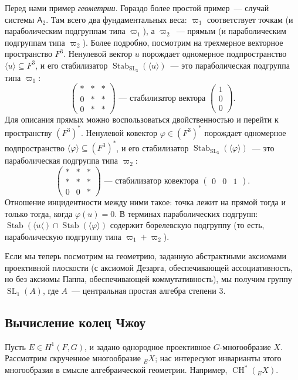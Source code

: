 \documentclass[a4paper]{article}
\DeclareMathOperator{\SL}{SL}
\DeclareMathOperator{\Stab}{Stab}
\DeclareMathOperator{\CH}{CH}
\newcommand{\ph}{\varphi}
\theoremstyle{definition}
\newcommand{\la}{\langle}
\newcommand{\ra}{\rangle}
\begin{document}
Перед нами пример \emph{геометрии}.
Гораздо более простой пример~--- случай системы $\mathsf{A}_2$.
Там всего два фундаментальных веса:
$\varpi_1$ соответствует точкам (и параболическим подгруппам типа $\varpi_1$),
а $\varpi_2$~--- прямым (и параболическим подгруппам типа $\varpi_2$).
Более подробно, посмотрим на трехмерное векторное пространство $F^3$.
Ненулевой вектор $u$ порождает одномерное подпространство
$\la u\ra\subseteq F^3$, и его стабилизатор
$\Stab_{\SL_3}(\la u\ra)$~--- это параболическая подгруппа типа $\varpi_1$:
\[
\begin{pmatrix}
* & * & * \\ 0 & * & * \\ 0 & * & *
\end{pmatrix}
\mbox{ --- стабилизатор вектора }
\begin{pmatrix} 1 \\ 0 \\ 0 \end{pmatrix}.
\]
Для описания прямых можно воспользоваться двойственностью и перейти
к пространству $(F^3)^*$.
Ненулевой ковектор $\ph\in(F^3)^*$ порождает одномерное подпространство
$\la\ph\ra\subseteq (F^3)^*$, и его стабилизатор
$\Stab_{\SL_3}(\la \ph \ra)$~--- это параболическая подгруппа типа
$\varpi_2$:
\[
\begin{pmatrix}
* & * & * \\ * & * & * \\ 0 & 0 & *
\end{pmatrix}
\mbox{ --- стабилизатор ковектора }
\begin{pmatrix} 0 & 0 & 1\end{pmatrix}.
\]
Отношение инцидентности между ними такое:
точка лежит на прямой тогда и только тогда, когда $\ph(u) = 0$.
В терминах параболических подгрупп:
$\Stab(\la u\la) \cap \Stab(\la \ph \ra)$ содержит борелевскую подгруппу
(то есть, параболическую подгруппу типа $\varpi_1 + \varpi_2$).

Если мы теперь посмотрим на геометрию, заданную абстрактными аксиомами
проективной плоскости (с аксиомой Дезарга, обеспечивающей ассоциативность,
но без аксиомы Паппа, обеспечивающей коммутативность),
мы получим группу $\SL_1(A)$, где $A$~--- центральная простая алгебра
степени $3$.

\subsection{Вычисление колец Чжоу}\label{ssect:chow-map-definition}

Пусть $E \in H^1 (F, G)$, и задано однородное проективное $G$-многообразие $X$.
Рассмотрим скрученное многообразие ${}_E X$; нас интересуют инварианты этого
многообразия в смысле алгебраической геометрии.
Например, $\CH^*({}_E X)$.
\end{document}
